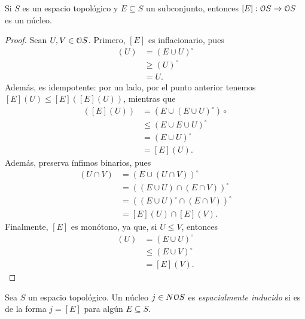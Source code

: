 \begin{proposition}
  Si $S$ es un espacio topológico y $E\subseteq S$ un
  subconjunto, entonces $[E]:\cal OS\to\cal OS$ es un núcleo.
\end{proposition}
\begin{proof}
  Sean $U,V\in\cal OS$.
  Primero, $[E]$ es inflacionario, pues
  \begin{align*}
    [E](U)
    &= (E\cup U)^\circ \\
    &\geq (U)^\circ \\
    &= U.
  \end{align*}
  Además, es idempotente: por un lado, por el punto anterior
  tenemos $[E](U)\leq[E]([E](U))$, mientras que
  \begin{align*}
    [E]([E](U))
    &= (E\cup (E\cup U)^\circ)\circ \\
    &\leq (E\cup E\cup U)^\circ \\
    &= (E\cup U)^\circ \\
    &= [E](U).
  \end{align*}
  Además, preserva ínfimos binarios, pues
  \begin{align*}
    [E](U\cap V)
    &= (E\cup(U\cap V))^\circ \\
    &= ((E\cup U)\cap(E\cap V))^\circ \\
    &= ((E\cup U)^\circ\cap(E\cap V))^\circ \\
    &= [E](U)\cap[E](V).
  \end{align*}
  Finalmente, $[E]$ es monótono, ya que, si $U\leq V$, entonces
  \begin{align*}
    [E](U)
    &= (E\cup U)^\circ \\
    &\leq (E\cup V)^\circ \\
    &= [E](V).
  \end{align*}
\end{proof}

\begin{definition}
  Sea $S$ un espacio topológico.
  Un núcleo $j\in N\cal O S$ es \emph{espacialmente
  inducido} si es de la forma $j=[E]$ para algún
  $E\subseteq S$.
\end{definition}

